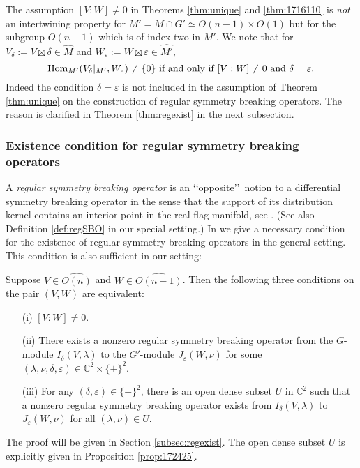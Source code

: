 \begin{remark}
\label{rem:MVW}
The assumption $[V:W]\ne 0$
 in Theorems \ref{thm:unique} and \ref{thm:1716110}
 is {\it{not}} an intertwining property
 for 
$M'=M \cap G' \simeq O(n-1) \times O(1)$
 but for the subgroup $O(n-1)$
 which is of index two in $M'$.  
We note that 
for 
$V_{\delta}:= V \boxtimes {\delta} \in \widehat M$
 and $W_{\varepsilon}:= W \boxtimes {\varepsilon} \in \widehat {M'}$, 
\[
\text{
$
\operatorname{Hom}_{M'}(V_{\delta}|_{M'}, W_{\varepsilon})\ne\{0\}
$
 if and only if $[V:W]\ne 0$ and $\delta=\varepsilon$.  
}
\]
Indeed the condition
$
\delta = \varepsilon
$ 
 is not included in the assumption of Theorem \ref{thm:unique}
 on the construction of regular symmetry breaking operators.  
The reason is clarified
 in Theorem \ref{thm:regexist} in the next subsection.  
\end{remark}


\subsubsection{Existence condition for regular symmetry breaking operators}
\label{subsec:regSBOexist}
A {\it{regular symmetry breaking operator}} is 
 an \lq\lq{opposite}\rq\rq\ notion
 to a differential symmetry breaking operator
 in the sense
 that the support of its distribution kernel contains 
an interior point
 in the real flag manifold,
 see \cite[Def.~3.3]{sbon}.  
(See also Definition \ref{def:regSBO} in our special setting.)  
In \cite[Cor.~3.6]{sbon}
 we give a necessary condition 
 for the existence of regular symmetry breaking operators
 in the general setting.
This condition is also sufficient in our setting:
\begin{theorem}
\label{thm:regexist}
Suppose $V \in \widehat {O(n)}$ and $W \in \widehat{O(n-1)}$.  
Then the following three conditions on the pair $(V,W)$ are equivalent:
\begin{enumerate}
\item[{\rm{(i)}}]
$[V:W] \ne 0$.  
\item[{\rm{(ii)}}]
There exists a nonzero regular symmetry breaking operator from 
 the $G$-module $I_{\delta}(V,\lambda)$
 to the $G'$-module $J_{\varepsilon}(W,\nu)$
 for some $(\lambda, \nu,\delta, \varepsilon) \in {\mathbb{C}}^2 \times \{\pm\}^2$.  
\item[{\rm{(iii)}}]
For any $(\delta, \varepsilon) \in \{\pm\}^2$, 
 there is an open dense subset $U$ in ${\mathbb{C}}^2$
 such that a nonzero regular symmetry breaking operator exists from $I_{\delta}(V,\lambda)$
 to $J_{\varepsilon}(W,\nu)$
 for all $(\lambda, \nu) \in U$.  
\end{enumerate}
\end{theorem}
The proof will be given in Section \ref{subsec:regexist}.  
The open dense subset $U$ is explicitly given in Proposition \ref{prop:172425}. 




